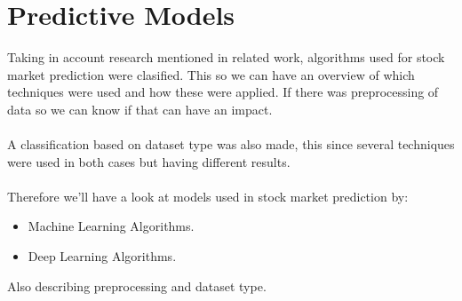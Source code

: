 \documentclass[conference]{IEEEtran}
\begin{document}
\section{Predictive Models}
Taking in account research mentioned in related work, algorithms used for stock market prediction were clasified. This so we can have an overview of which techniques were used
and how these were applied. If there was preprocessing of data so we can know if that can have an impact.
\\\\
A classification based on dataset type was also made, this since several techniques were used in both cases but having  different results. 
\\\\
Therefore we'll have a look at models used in stock market prediction by:
\begin{itemize}
  \item Machine Learning Algorithms.
  \item Deep Learning Algorithms.
\end{itemize}
Also describing preprocessing and dataset type.
\end{document}
